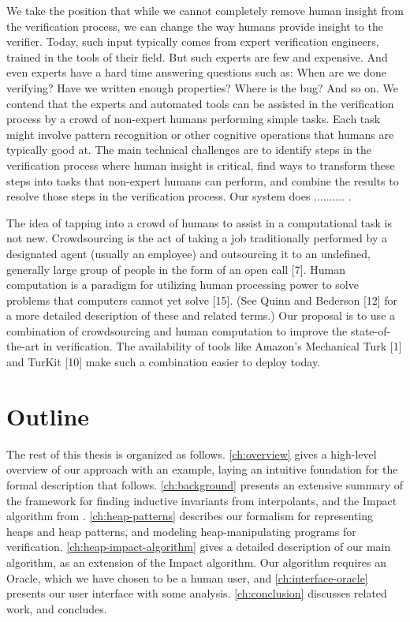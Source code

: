 We take the position that while we cannot completely remove human insight from the verification process, we can change the way humans provide insight to the verifier. Today, such input typically comes from expert verification engineers, trained in the tools of their field. But such experts are few and expensive. And even experts have a hard time answering questions such as: When are we done verifying? Have we written enough properties? Where is the bug? And so on. We contend that the experts and automated tools can be assisted in the verification process by a crowd of non-expert humans performing simple tasks. Each task might involve pattern recognition or other cognitive operations that humans are typically good at. The main technical challenges are to identify steps in the verification process where human insight is critical, find ways to transform these steps into tasks that non-expert humans can perform, and combine the results to resolve those steps in the verification process. Our system does .......... .

The idea of tapping into a crowd of humans to assist in a computational
task is not new. Crowdsourcing is the act of taking a
job traditionally performed by a designated agent (usually an employee)
and outsourcing it to an undefined, generally large group
of people in the form of an open call [7]. Human computation is a
paradigm for utilizing human processing power to solve problems
that computers cannot yet solve [15]. (See Quinn and Bederson [12]
for a more detailed description of these and related terms.) Our proposal
is to use a combination of crowdsourcing and human computation
to improve the state-of-the-art in verification. The availability
of tools like Amazon’s Mechanical Turk [1] and TurKit [10] make
such a combination easier to deploy today.

\section{Outline}

The rest of this thesis is organized as follows. \autoref{ch:overview} gives a high-level overview of our approach with an example, laying an intuitive foundation for the formal description that follows. \autoref{ch:background} presents an extensive summary of the framework for finding inductive invariants from interpolants, and the Impact algorithm from \cite{mcmillan06}. \autoref{ch:heap-patterns} describes our formalism for representing heaps and heap patterns, and modeling heap-manipulating programs for verification. \autoref{ch:heap-impact-algorithm} gives a detailed description of our main algorithm, as an extension of the Impact algorithm. Our algorithm requires an Oracle, which we have chosen to be a human user, and \autoref{ch:interface-oracle} presents our user interface with some analysis. \autoref{ch:conclusion} discusses related work, and concludes.

